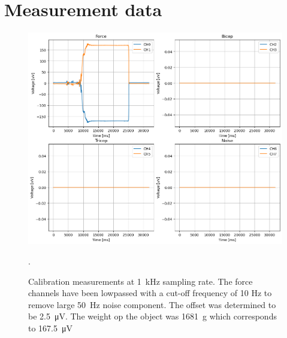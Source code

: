 \section{Measurement data}


\begin{figure}[h!t]
	\begin{center}
		\includegraphics[width=1.0\columnwidth]{images/measurement_calibratie2_1k.png}
	\end{center}
	\caption{Calibration measurements at \SI{1}{\kilo\hertz} sampling rate. The force channels have been lowpassed with a cut-off frequency of 10 Hz to remove large \SI{50}{\hertz} noise component. The offset was determined to be \SI{2.5}{\micro\volt}. The weight op the object was \SI{1681}{\gram} which corresponds to \SI{167.5}{\micro\volt}}.
	\label{fig:calibration_1k}
\end{figure}

